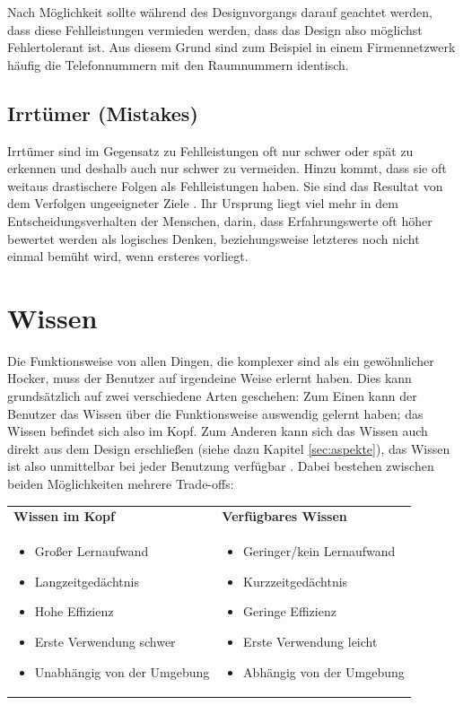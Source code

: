 \documentclass[parskip,headsepline, headtopline, %
footsepline, oneside, 12pt, headings=small]{scrreprt}
\begin{document}
Nach Möglichkeit sollte während des Designvorgangs darauf geachtet werden, dass diese Fehlleistungen vermieden werden, dass das Design also möglichst Fehlertolerant ist. Aus diesem Grund sind zum Beispiel in einem Firmennetzwerk häufig die Telefonnummern mit den Raumnummern identisch.

\subsection{Irrtümer (Mistakes)}

Irrtümer sind im Gegensatz zu Fehlleistungen oft nur schwer oder spät zu erkennen und deshalb auch nur schwer zu vermeiden. Hinzu kommt, dass sie oft weitaus drastischere Folgen als Fehlleistungen haben. Sie sind das Resultat von dem Verfolgen ungeeigneter Ziele \cite[S. 114]{don}. Ihr Ursprung liegt viel mehr in dem Entscheidungsverhalten der Menschen, darin, dass Erfahrungswerte oft höher bewertet werden als logisches Denken, beziehungsweise letzteres noch nicht einmal bemüht wird, wenn ersteres vorliegt.

\section{Wissen}

Die Funktionsweise von allen Dingen, die komplexer sind als ein gewöhnlicher Hocker, muss der Benutzer auf irgendeine Weise erlernt haben. Dies kann grundsätzlich auf zwei verschiedene Arten geschehen: Zum Einen kann der Benutzer das Wissen über die Funktionsweise auswendig gelernt haben; das Wissen befindet sich also im Kopf. Zum Anderen kann sich das Wissen auch direkt aus dem Design erschließen (siehe dazu Kapitel \ref{sec:aspekte}), das Wissen ist also unmittelbar bei jeder Benutzung verfügbar \cite[S. 54ff]{don}. 
Dabei bestehen zwischen beiden Möglichkeiten mehrere Trade-offs:

\begin{tabular}{p{}p{}}\vspace{6pt}
\hspace{1cm}\textbf{Wissen im Kopf} & \vspace{6pt}\hspace{1cm}\textbf{Verfügbares Wissen}\\
\begin{itemize}
\item Großer Lernaufwand
\item Langzeitgedächtnis
\item Hohe Effizienz
\item Erste Verwendung schwer
\item Unabhängig von der Umgebung
\end{itemize} &
\begin{itemize}
\item Geringer/kein Lernaufwand
\item Kurzzeitgedächtnis
\item Geringe Effizienz
\item Erste Verwendung leicht
\item Abhängig von der Umgebung
\end{itemize}
\\
\end{tabular}
\end{document}
